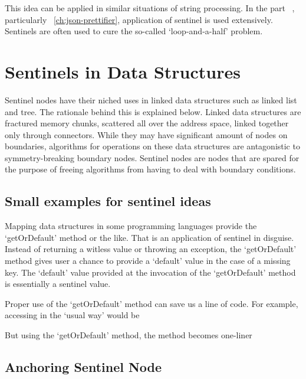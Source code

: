 This idea can be applied in similar situations of string processing.
In the part ~, particularly ~\autoref{ch:json-prettifier}, application of
sentinel is used extensively.
Sentinels are often used to cure the so-called `loop-and-a-half' problem.


\section{Sentinels in Data Structures}\label{sec:sentinelsInDS}

Sentinel nodes have their niched uses in linked data structures such as linked list and tree.
The rationale behind this is explained below.
Linked data structures are fractured memory chunks, scattered all over the address space,
linked together only through connectors.
While they may have significant amount of nodes on boundaries,
algorithms for operations on these data structures are antagonistic to symmetry-breaking boundary
nodes.
Sentinel nodes are nodes that are spared for the purpose of freeing algorithms from having to
deal with boundary conditions.

\subsection{Small examples for sentinel ideas}\label{subsec:small-examples-for-sentinel-ideas}

Mapping data structures in some programming languages provide the `getOrDefault' method or the
like.
That is an application of sentinel in disguise.
Instead of returning a witless  value or throwing an exception,
the `getOrDefault' method gives user a chance to provide a `default' value
in the case of a missing key.
The `default' value provided at the invocation of the `getOrDefault' method
is essentially a sentinel value.

Proper use of the `getOrDefault' method can save us a line of code.
For example, accessing  in the `usual way' would be

But using the `getOrDefault' method, the method becomes one-liner



\subsection{Anchoring Sentinel Node}\label{subsec:anchoringSentinels}

